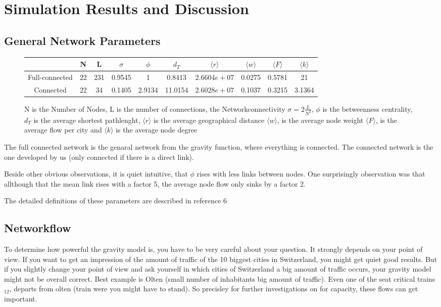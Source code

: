 \documentclass[11pt]{article}
\begin{document}
\section{Simulation Results and Discussion}

\subsection{General Network Parameters}
\begin{figure}[h]
\begin{tabular}{c|c|c|c|c|c|c|c|c|c|}
 & N & L & $\sigma$ & $\phi$ & $d_T$ & $\langle r\rangle$ & 
 $\langle w\rangle$ & $\langle F\rangle$&$\langle k\rangle$ \\\hline
 Full-connected & 22 & 231 &0.9545&1& 0.8413& $2.6604e+07$&0.0275&0.5781& 21\\\hline
 
 Connected & 22 & 34 &    0.1405&2.9134& 11.0154&$2.6028e+07$&0.1037&0.3215& 3.1364\\\hline
\end{tabular}
\caption{N is the Number of Nodes, L is the number of connections, the Networkconnectivity $\sigma=2\frac{L}{N^2}$, $\phi$ is the betweenness centrality, $d_T$ is the average shortest pathlenght,  $\langle r\rangle$ is the average geographical distance  
 $\langle w\rangle$, is the average node weight $\langle F\rangle$, is the average flow per city and $\langle k\rangle$ is the average node degree}
\end{figure}

The full connected network is the genaral network from the gravity function, where everything is connected. The connected network is the one developed by us (only connected if there is a direct link).

Beside other obvious observations, it is quiet intuitive, that $\phi$ rises with less links between nodes. One surprisingly observation was that allthough that the mean link rises with a factor 5, the average node flow only sinks by a factor 2.\newline

The detailed definitions of these parameters are described in reference 6 


\subsection{Networkflow}

To determine how powerful the gravity model is, you have to be very careful about your question. It strongly depends on your point of view. If you want to get an impression of the amount of traffic of the 10 biggest cities in Switzerland, you might get quiet good results. But if you slightly change your point of view and ask yourself in which cities of Switzerland a big amount of traffic occurs, your gravity model might not be overall correct. Best example is Olten (small number of inhabitants big amount of traffic). Even one of the seat critical trains$_{12}$, departs from olten (train were you might have to stand). So precisley for further investigations on for capacity, these flows can get important.
\end{document}

